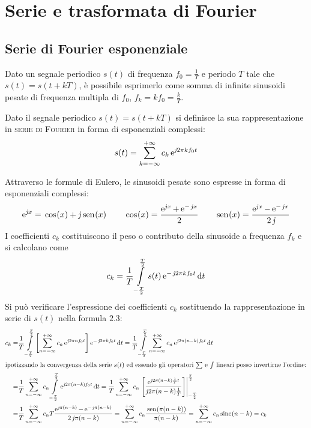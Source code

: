 \chapter{Serie e trasformata di Fourier}
\label{ch:teoriasegnali-capitolo2}
\section{Serie di Fourier esponenziale}
Dato un segnale periodico $s(t)$ di frequenza $f_0=\frac{1}{T}$ e periodo $T$ tale che $s(t)=s(t+k T)$, è possibile esprimerlo come somma di infinite sinusoidi pesate di frequenza multipla di $f_0$, $f_k=k f_0=\frac{k}{T}$.

\begin{definizione}
Dato il segnale periodico $s(t)=s(t+k T)$ si definisce la sua rappresentazione in \textsc{serie di Fourier} in forma di esponenziali complessi:
\begin{equation}
	\label{eq:serie_fourier}
	s(t)=\sum_{k=-\infty}^{+\infty} c_k \operatorname{e}^{\operatorname{\mathit{j}\!} 2\pi k f_0 t}
\end{equation}
\end{definizione}
Attraverso le formule di Eulero, le sinusoidi pesate sono espresse in forma di esponenziali complessi:
\begin{equation}
	\e{\imath x}=\cos{x}+\imath\sen{x}\qquad\cos{x}=\frac{\e{\imath x}+\e{-\imath x}}{2}\qquad\sen{x}=\frac{\e{\imath x}-\e{-\imath x}}{2\imath}
\end{equation}
I coefficienti $c_k$ costituiscono il peso o contributo della sinusoide a frequenza $f_k$ e si calcolano come
\begin{equation}
	\label{eq:serie_fourier_coef}
	c_k=\frac{1}{T}\int\limits_{-\frac{T}{2}}^{\frac{T}{2}}{s(t)\operatorname{e}^{-\operatorname{\mathit{j}\!} 2\pi k f_0 t}}{\,\mathop{}\!\mathrm{d}{t}}
\end{equation}
Si può verificare l'espressione dei coefficienti $c_k$ sostituendo la rappresentazione in serie di $s(t)$ nella formula $2.3$:
\begin{align*}
	c_k=&\frac{1}{T}\intd{-\frac{T}{2}}{\frac{T}{2}}{ \left[\sum_{n=-\infty}^{+\infty} c_n \e{\imath 2\pi n f_0 t}\right] \e{-\imath 2\pi k f_0 t}}{t} 
	=\frac{1}{T}\intd{-\frac{T}{2}}{\frac{T}{2}}{ \sum_{n=-\infty}^{+\infty} c_n \e{\imath 2\pi (n-k) f_0 t} }{t} \\
\intertext{ipotizzando la convergenza della serie $s(t)$ ed essendo gli operatori $\sum$ e $\int$ lineari posso invertirne l'ordine:} 
	=&\frac{1}{T}\sum_{n=-\infty}^{+\infty} c_n \intd{-\frac{T}{2}}{\frac{T}{2}}{\e{\imath 2\pi(n-k)f_0 t}}{t}
	=\frac{1}{T}\sum_{n=-\infty}^{+\infty} c_n \bound{-\frac{T}{2}}{\frac{T}{2}}{\frac{\e{\imath 2\pi(n-k)\frac{1}{T}t}}{\imath 2\pi(n-k)\frac{1}{T} }}\\
	=&\frac{1}{T}\sum_{n=-\infty}^{+\infty} c_n T \frac{\e{\imath \pi(n-k)}-\e{-\imath\pi(n-k)}}{2\imath\pi(n-k)}
	=\sum_{n=-\infty}^{+\infty} c_n \frac{\sen{\pi(n-k)}}{\pi(n-k)}
	=\sum_{n=-\infty}^{+\infty} c_n \sinc{n-k} = c_k
\end{align*}
